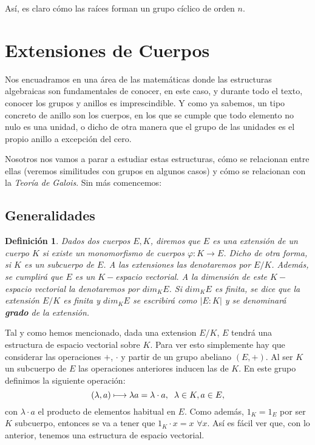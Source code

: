 \documentclass[12pt]{article}
\newtheorem{definition}[theorem]{Definición}
\begin{document}
Así, es claro cómo las raíces forman un grupo cíclico de orden $n$.
\section{Extensiones de Cuerpos}
Nos encuadramos en una área de las matemáticas donde las estructuras algebraicas son fundamentales de conocer, en este caso, y durante todo el texto, conocer los grupos y anillos es imprescindible. Y como ya sabemos, un tipo concreto de anillo son los cuerpos, en los que se cumple que todo elemento no nulo es una unidad, o dicho de otra manera que el grupo de las unidades es el propio anillo a excepción del cero. 

Nosotros nos vamos a parar a estudiar estas estructuras, cómo se relacionan entre ellas (veremos similitudes con grupos en algunos casos) y cómo se relacionan con la \textit{Teoría de Galois}. Sin más comencemos:
\subsection{Generalidades}
\begin{definition} Dados dos cuerpos $E,K$, diremos que $E$ es una extensión de un cuerpo $K$ si existe un monomorfismo de cuerpos $\varphi \colon K \longrightarrow E$. Dicho de otra forma, si $K$ es un subcuerpo de $E$. A las extensiones las denotaremos por $E/K$.
Además, se cumplirá que $E$ es un $K-$espacio vectorial. A la dimensión de este $K-$espacio vectorial la denotaremos por $dim_{K}E$. Si $dim_{K}E$ es finita, se dice que la extensión $E/K$ es finita y $dim_{K}E$ se escribirá como $| E : K|$ y se denominará \textbf{grado} de la extensión.
\end{definition}

Tal y como hemos mencionado, dada una extension $E/K$, $E$ tendrá una estructura de espacio vectorial sobre $K$. Para ver esto simplemente hay que considerar las operaciones $+$, $\cdot$ y partir de un grupo abeliano $(E, +)$. Al ser $K$ un subcuerpo de $E$ las operaciones anteriores inducen las de $K$. En este grupo definimos la siguiente operación: $$(\lambda, a) \longmapsto \lambda a = \lambda \cdot a, \hspace{0.2cm} \lambda \in K, a \in E,$$ con $\lambda \cdot a$ el producto de elementos habitual en $E$. Como además, $1_{K} = 1_{E}$ por ser $K$ subcuerpo, entonces se va a tener que $1_{K} \cdot x = x$ $\forall x$. Así es fácil ver que, con lo anterior, tenemos una estructura de espacio vectorial.
\end{document}
